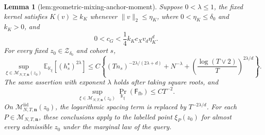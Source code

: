 \documentclass{article}
\newtheorem{lemma}{Lemma}
\begin{document}
\begin{lemma}[lem:geometric-mixing-anchor-moment]\label{lem:geometric-mixing-anchor-moment}
Suppose \(0<\lambda\le1\), the fixed kernel satisfies
\(K(v)\ge k_K\) whenever \(\|v\|_2\le\eta_K\), where
\(0<\eta_K\le\delta_0\) and \(k_K>0\), and
\[
 0<c_G<\frac14 k_Kc_Xv_d\eta_K^d.
\]
For every fixed \(z_0\in\mathcal Z_{\delta_0}\) and cohort \(s\),
\[
 \sup_{\xi\in\mathcal M_{N,T,\mathbf n}(z_0)}
 \mathbb E_{\mathbb K_\xi}[(h_s^\star)^{2\lambda}]
 \le C\left\{(Tn_s)^{-2\lambda/(2\lambda+d)}+N^{-\lambda}
 +\left(\frac{\log(T\vee2)}{T}\right)^{2\lambda/d}\right\}.
\]
The same assertion with exponent \(\lambda\) holds after taking square
roots, and
\[
 \sup_{\xi\in\mathcal M_{N,T,\mathbf n}(z_0)}
 \Pr_{\mathbb K_\xi}(\mathsf F_{\mathrm{fb}})\le CT^{-2}.
\]
On \(\mathcal M^{\mathrm{iid}}_{N,T,\mathbf n}(z_0)\), the logarithmic
spacing term is replaced by \(T^{-2\lambda/d}\).  For each
\(P\in\mathcal M_{N,T,\mathbf n}\), these conclusions apply to the labelled
point \(\xi_P(z_0)\) for almost every admissible \(z_0\) under the marginal
law of the query.
\end{lemma}
\end{document}
